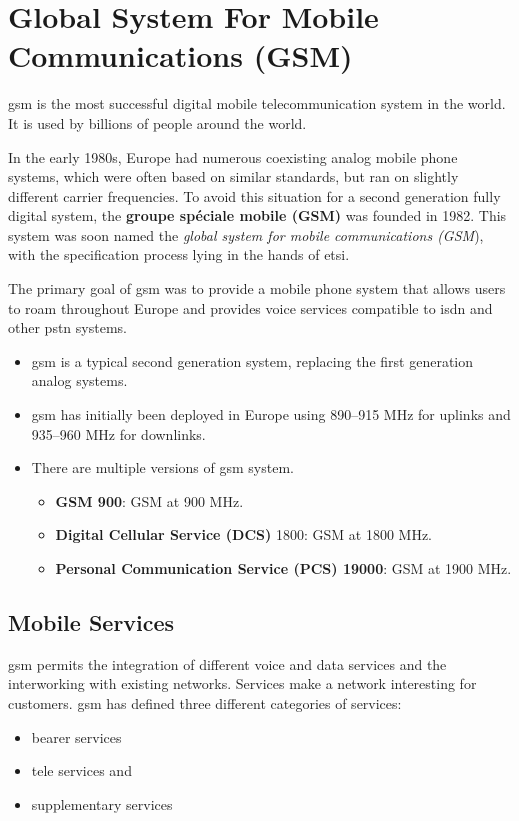 
\chapter[Global System For Mobile Communications]{Global System For Mobile Communications (GSM)}
\gls{gsm} is the most successful digital mobile telecommunication system in the world. It is used by billions of people around the world.

In the early 1980s, Europe had numerous coexisting analog mobile phone systems, which were often based on similar standards, but ran on slightly different carrier frequencies. To avoid this situation for a second generation fully digital system, the \textbf{groupe spéciale mobile (GSM)} was founded in 1982. This system was soon named the \textit{global system for mobile communications (GSM}), with the specification process lying in the hands of \gls{etsi}. 

The primary goal of \gls{gsm} was to provide a mobile phone system that allows users to roam throughout Europe and provides voice services compatible to \gls{isdn} and other \gls{pstn} systems.

\begin{itemize}
	\item \gls{gsm} is a typical second generation system, replacing the first generation analog systems. 
	\item \gls{gsm} has initially been deployed in Europe using 890–915 MHz for uplinks and 935–960 MHz for downlinks.
	\item There are multiple versions of \gls{gsm} system.
		\begin{itemize}
			\item \textbf{GSM 900}: GSM at 900 MHz.
			\item \textbf{Digital Cellular Service (DCS)} 1800: GSM at 1800 MHz.
			\item \textbf{Personal Communication Service (PCS) 19000}: GSM at 1900 MHz.	
		\end{itemize}
\end{itemize}


\section{Mobile Services}
\gls{gsm} permits the integration of different voice and data services and the interworking with existing networks. Services make a network interesting for customers. \gls{gsm} has defined three different categories of services: 
\begin{itemize}
	\item bearer services
	\item tele services and
	\item supplementary services
\end{itemize}

